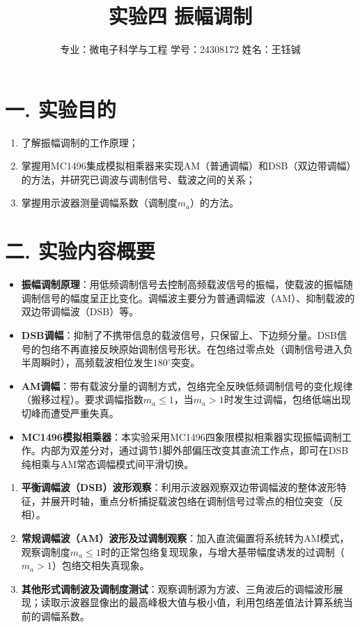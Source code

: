 \documentclass[12pt]{article}
\title{\Huge \textbf{实验四 \quad 振幅调制}}
\author{专业：微电子科学与工程 \quad 学号：24308172 \quad 姓名：王钰铖}
\date{}
\begin{document}
\maketitle

\section*{一. 实验目的}
\begin{enumerate}
    \item 了解振幅调制的工作原理；
    \item 掌握用MC1496集成模拟相乘器来实现AM（普通调幅）和DSB（双边带调幅）的方法，并研究已调波与调制信号、载波之间的关系；
    \item 掌握用示波器测量调幅系数（调制度$m_a$）的方法。
\end{enumerate}

\section*{二. 实验内容概要}

\vspace{1em}
\begin{itemize}
    \item \textbf{振幅调制原理}：用低频调制信号去控制高频载波信号的振幅，使载波的振幅随调制信号的幅度呈正比变化。调幅波主要分为普通调幅波（AM）、抑制载波的双边带调幅波（DSB）等。
    \item \textbf{DSB调幅}：抑制了不携带信息的载波信号，只保留上、下边频分量。DSB信号的包络不再直接反映原始调制信号形状。在包络过零点处（调制信号进入负半周瞬时），高频载波相位发生$180^\circ$突变。
    \item \textbf{AM调幅}：带有载波分量的调制方式，包络完全反映低频调制信号的变化规律（搬移过程）。要求调幅指数$m_a \le 1$，当$m_a > 1$时发生过调幅，包络低端出现切峰而遭受严重失真。
    \item \textbf{MC1496模拟相乘器}：本实验采用MC1496四象限模拟相乘器实现振幅调制工作。内部为双差分对，通过调节1脚外部偏压改变其直流工作点，即可在DSB纯相乘与AM常态调幅模式间平滑切换。
\end{itemize}

\vspace{1em}
\begin{enumerate}
    \item[(1)] \textbf{平衡调幅波（DSB）波形观察}：利用示波器观察双边带调幅波的整体波形特征，并展开时轴，重点分析捕捉载波包络在调制信号过零点的相位突变（反相）。
    \item[(2)] \textbf{常规调幅波（AM）波形及过调制观察}：加入直流偏置将系统转为AM模式，观察调制度$m_a \le 1$时的正常包络复现现象，与增大基带幅度诱发的过调制（$m_a > 1$）包络交相失真现象。
    \item[(3)] \textbf{其他形式调制波及调制度测试}：观察调制源为方波、三角波后的调幅波形展现；读取示波器显像出的最高峰极大值与极小值，利用包络差值法计算系统当前的调幅系数。
\end{enumerate}
\end{document}
